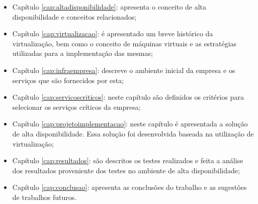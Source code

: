\begin{itemize}
 \item Capítulo \ref{cap:altadisponibilidade}: apresenta o conceito de alta disponibilidade e conceitos relacionados;
 \item Capítulo \ref{cap:virtualizacao}: é apresentado um breve histórico da virtualização, bem como o conceito de máquinas virtuais e as 
 estratégias utilizadas para a implementação das mesmas;
 \item Capítulo \ref{cap:infraempresa}: descreve o ambiente inicial da empresa e os serviços que são fornecidos por esta;
 \item Capítulo \ref{cap:servicoscriticos}: neste capítulo são definidos os critérios para selecionar os serviços críticos da empresa;
 \item Capítulo \ref{cap:projetoimplementacao}: neste capítulo é apresentada a solução de alta disponibilidade. Essa solução foi 
 desenvolvida baseada na utilização de virtualização;
 \item Capítulo \ref{cap:resultados}: são descritos os testes realizados e feita a análise dos resultados proveniente dos testes 
 no ambiente de alta disponibilidade;
 \item Capítulo \ref{cap:conclusao}: apresenta as conclusões do trabalho e as sugestões de trabalhos futuros.
\end{itemize}
